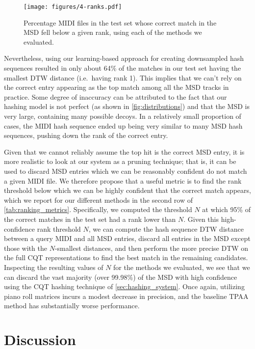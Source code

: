\begin{figure}
  \texttt{[image: figures/4-ranks.pdf]}
  \caption[Percentage of the test set below a given rank]{Percentage MIDI files in the test set whose correct match in the MSD fell below a given rank, using each of the methods we evaluated.}
  \label{fig:ranks}
\end{figure}

Nevertheless, using our learning-based approach for creating downsampled hash sequences resulted in only about 64\% of the matches in our test set having the smallest DTW distance (i.e.\ having rank 1).
This implies that we can't rely on the correct entry appearing as the top match among all the MSD tracks in practice.
Some degree of inaccuracy can be attributed to the fact that our hashing model is not perfect (as shown in \cref{fig:distributions}) and that the MSD is very large, containing many possible decoys.
In a relatively small proportion of cases, the MIDI hash sequence ended up being very similar to many MSD hash sequences, pushing down the rank of the correct entry.

Given that we cannot reliably assume the top hit is the correct MSD entry, it is more realistic to look at our system as a pruning technique; that is, it can be used to discard MSD entries which we can be reasonably confident do not match a given MIDI file.
We therefore propose that a useful metric is to find the rank threshold below which we can be highly confident that the correct match appears, which we report for our different methods in the second row of \cref{tab:ranking_metrics}.
Specifically, we computed the threshold $N$ at which 95\% of the correct matches in the test set had a rank lower than $N$.
Given this high-confidence rank threshold $N$, we can compute the hash sequence DTW distance between a query MIDI and all MSD entries, discard all entries in the MSD except those with the $N$-smallest distances, and then perform the more precise DTW on the full CQT representations to find the best match in the remaining candidates.
Inspecting the resulting values of $N$ for the methods we evaluated, we see that we can discard the vast majority (over 99.98\%) of the MSD with high confidence using the CQT hashing technique of \cref{sec:hashing_system}.
Once again, utilizing piano roll matrices incurs a modest decrease in precision, and the baseline TPAA method has substantially worse performance.

\section{Discussion}
\label{sec:dhs_discussion}

